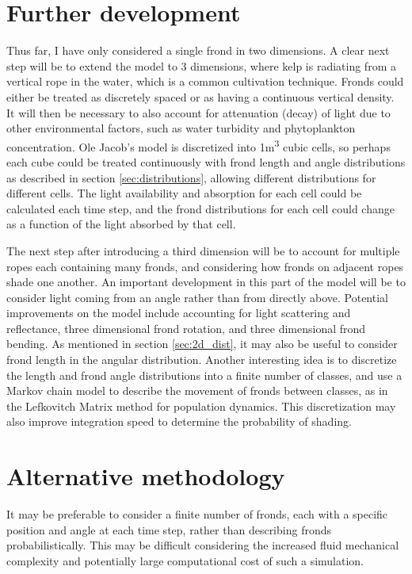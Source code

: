 \documentclass[10pt]{article}
\begin{document}
\begin{multicols}{2}
\section{Further development}
Thus far, I have only considered a single frond in two dimensions.
A clear next step will be to extend the model to 3 dimensions, where kelp is radiating from a vertical rope in the water, which is a common cultivation technique.
Fronds could either be treated as discretely spaced or as having a continuous vertical density.
It will then be necessary to also account for attenuation (decay) of light due to other environmental factors, such as water turbidity and phytoplankton concentration.
Ole Jacob's model is discretized into 1m\textsuperscript{3} cubic cells, so perhaps each cube could be treated continuously with frond length and angle distributions as described in section \ref{sec:distributions}, allowing different distributions for different cells.
The light availability and absorption for each cell could be calculated each time step, and the frond distributions for each cell could change as a function of the light absorbed by that cell.

The next step after introducing a third dimension will be to account for multiple ropes each containing many fronds, and considering how fronds on adjacent ropes shade one another.
An important development in this part of the model will be to consider light coming from an angle rather than from directly above.
Potential improvements on the model include accounting for light scattering and reflectance, three dimensional frond rotation, and three dimensional frond bending.
As mentioned in section \ref{sec:2d_dist}, it may also be useful to consider frond length in the angular distribution.
Another interesting idea is to discretize the length and frond angle distributions into a finite number of classes, and use a Markov chain model to describe the movement of fronds between classes, as in the Lefkovitch Matrix method for population dynamics.
This discretization may also improve integration speed to determine the probability of shading.

\section{Alternative methodology}
It may be preferable to consider a finite number of fronds, each with a specific position and angle at each time step, rather than describing fronds probabilistically. This may be difficult considering the increased fluid mechanical complexity and potentially large computational cost of such a simulation.


\end{multicols}
\end{document}
